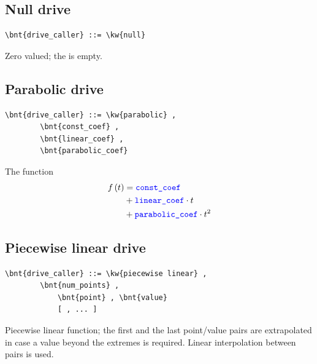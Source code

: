 \subsection{Null drive}
\begin{Verbatim}[commandchars=\\\{\}]
    \bnt{drive_caller} ::= \kw{null}
\end{Verbatim}
Zero valued; the  is empty.

\subsection{Parabolic drive}
\begin{Verbatim}[commandchars=\\\{\}]
    \bnt{drive_caller} ::= \kw{parabolic} ,
        \bnt{const_coef} , 
        \bnt{linear_coef} , 
        \bnt{parabolic_coef}
\end{Verbatim}
The function
\begin{align}
	f\left( t \right) &= \textcolor{blue}{\texttt{const\_coef}} \nonumber \\
		&+ \textcolor{blue}{\texttt{linear\_coef}} \cdot t \nonumber \\
		&+ \textcolor{blue}{\texttt{parabolic\_coef}} \cdot t^2
\end{align}

\subsection{Piecewise linear drive}
\begin{Verbatim}[commandchars=\\\{\}]
    \bnt{drive_caller} ::= \kw{piecewise linear} ,
        \bnt{num_points} ,
            \bnt{point} , \bnt{value} 
            [ , ... ]
\end{Verbatim}
Piecewise linear function; the first and the last point/value pairs are
extrapolated in case a value beyond the extremes is required.
Linear interpolation between pairs is used.

